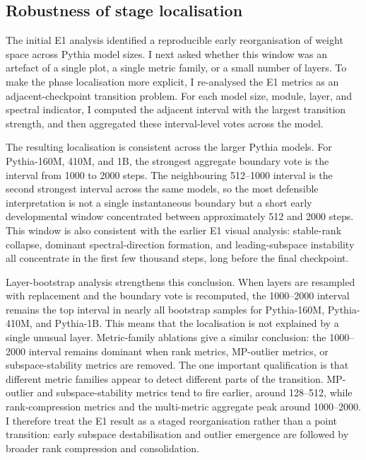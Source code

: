 
\subsection{Robustness of stage localisation}
\label{sec:e1-stage-robustness}

The initial E1 analysis identified a reproducible early reorganisation of weight space across Pythia model sizes. I next asked whether this window was an artefact of a single plot, a single metric family, or a small number of layers. To make the phase localisation more explicit, I re-analysed the E1 metrics as an adjacent-checkpoint transition problem. For each model size, module, layer, and spectral indicator, I computed the adjacent interval with the largest transition strength, and then aggregated these interval-level votes across the model.

The resulting localisation is consistent across the larger Pythia models. For Pythia-160M, 410M, and 1B, the strongest aggregate boundary vote is the interval from 1000 to 2000 steps. The neighbouring 512--1000 interval is the second strongest interval across the same models, so the most defensible interpretation is not a single instantaneous boundary but a short early developmental window concentrated between approximately 512 and 2000 steps. This window is also consistent with the earlier E1 visual analysis: stable-rank collapse, dominant spectral-direction formation, and leading-subspace instability all concentrate in the first few thousand steps, long before the final checkpoint.

Layer-bootstrap analysis strengthens this conclusion. When layers are resampled with replacement and the boundary vote is recomputed, the 1000--2000 interval remains the top interval in nearly all bootstrap samples for Pythia-160M, Pythia-410M, and Pythia-1B. This means that the localisation is not explained by a single unusual layer. Metric-family ablations give a similar conclusion: the 1000--2000 interval remains dominant when rank metrics, MP-outlier metrics, or subspace-stability metrics are removed. The one important qualification is that different metric families appear to detect different parts of the transition. MP-outlier and subspace-stability metrics tend to fire earlier, around 128--512, while rank-compression metrics and the multi-metric aggregate peak around 1000--2000. I therefore treat the E1 result as a staged reorganisation rather than a point transition: early subspace destabilisation and outlier emergence are followed by broader rank compression and consolidation.

